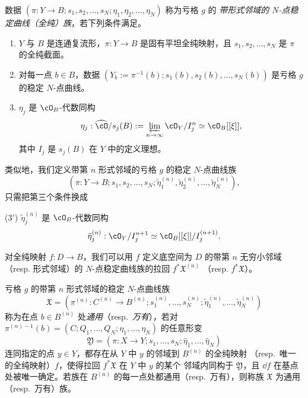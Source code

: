 \begin{definition}[1.23]
数据 $(\pi:Y\to B;s_1,s_2,\dots,s_N;\eta_1,\eta_2,\dots,\eta_N)$ 称为亏格 $g$ 的
\emph{带形式邻域的 $N$-点稳定曲线（全纯）族}，若下列条件满足。
\begin{enumerate}[label=(\arabic*)]
  \item $Y$ 与 $B$ 是连通复流形，$\pi:Y\to B$ 是固有平坦全纯映射，且
        $s_1,s_2,\dots,s_N$ 是 $\pi$ 的全纯截面。
  \item 对每一点 $b\in B$，数据
        $(Y_b:=\pi^{-1}(b);s_1(b),s_2(b),\dots,s_N(b))$ 是亏格 $g$ 的稳定
        $N$-点曲线。
  \item $\eta_j$ 是 $\cO_B$-代数同构
\[
\eta_j:\widehat{\cO}/s_j(B):=\varprojlim_{n\to\infty}\cO_Y/I_j^n
\simeq\cO_B[[\xi]],
\]
        其中 $I_j$ 是 $s_j(B)$ 在 $Y$ 中的定义理想。
\end{enumerate}
\end{definition}

类似地，我们定义带第 $n$ 形式邻域的亏格 $g$ 的稳定 $N$-点曲线族
\[
(\pi:Y\to B;s_1,s_2,\dots,s_N;
\tilde{\eta}_1^{(n)},\tilde{\eta}_2^{(n)},\dots,\tilde{\eta}_N^{(n)}),
\]
只需把第三个条件换成

(3$'$) $\tilde{\eta}_j^{(n)}$ 是 $\cO_B$-代数同构
\[
\tilde{\eta}_j^{(n)}:\cO_Y/I_j^{n+1}\simeq\cO_B[[\xi]]/I_j^{(n+1)} .
\]

对全纯映射 $f:D\to B$，我们可以用 $f$ 定义底空间为 $D$ 的带第 $n$ 无穷小邻域
（resp. 形式邻域）的 $N$-点稳定曲线族的拉回 $f^*\mathfrak{X}^{(n)}$
（resp. $f^*\mathfrak{X}$）。

\begin{definition}[1.24]
亏格 $g$ 的带第 $n$ 形式邻域的稳定 $N$-点曲线族
\[
\mathfrak{X}=(\pi^{(n)}:C^{(n)}\to B^{(n)};
s_1^{(n)},\dots,s_N^{(n)};
\tilde{\eta}_1^{(n)},\dots,\tilde{\eta}_N^{(n)})
\]
称为在点 $b\in B^{(n)}$ 处\emph{通用}（resp.\ \emph{万有}），若对
$\pi^{(n)-1}(b)=(C;Q_1,\dots,Q_N;\eta_1,\dots,\eta_N)$ 的任意形变
\[
\mathfrak{Y}=(\pi:X\to Y;s_1,\dots,s_N;\hat{\eta}_1,\dots,\hat{\eta}_N)
\]
连同指定的点 $y\in Y$，都存在从 $Y$ 中 $y$ 的邻域到 $B^{(n)}$ 的全纯映射
（resp.\ 唯一的全纯映射）$f$，使得拉回 $f^*\mathfrak{X}$ 在 $Y$ 中 $y$ 的某个
邻域内同构于 $\mathfrak{Y}$，且 $\dd f$ 在基点处被唯一确定。若族在 $B^{(n)}$
的每一点处都通用（resp.\ 万有），则称族 $\mathfrak{X}$ 为通用（resp.\ 万有）族。
\end{definition}

